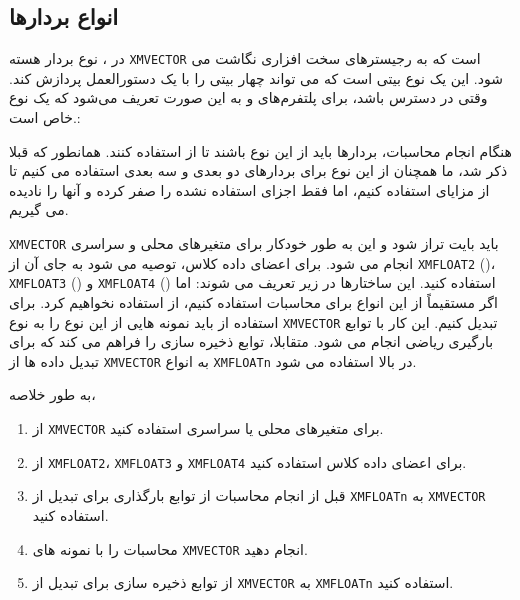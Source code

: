 \subsection{\textbf{انواع بردارها}}
{
    \Large
    \begin{spacing}{1.5}
        در ، نوع بردار هسته \texttt{XMVECTOR} است که به رجیسترهای سخت افزاری  نگاشت می شود.
        این یک نوع  بیتی است که می تواند چهار   بیتی را با یک دستورالعمل  پردازش کند.
        وقتی  در دسترس باشد، برای پلتفرم‌های  و  به این صورت تعریف می‌شود که  یک نوع  خاص است.:

        \begin{flushleft}
        \end{flushleft}

        هنگام انجام محاسبات، بردارها باید از این نوع باشند تا از  استفاده کنند.
        همانطور که قبلا ذکر شد، ما همچنان از این نوع برای بردارهای دو بعدی و سه بعدی استفاده می کنیم تا از مزایای  استفاده کنیم،
        اما فقط اجزای استفاده نشده را صفر کرده و آنها را نادیده می گیریم.

        \texttt{XMVECTOR} باید  بایت تراز شود و این به طور خودکار برای متغیرهای محلی و سراسری انجام می شود.
        برای اعضای داده کلاس، توصیه می شود به جای آن از \texttt{XMFLOAT2} ()، \texttt{XMFLOAT3} () و \texttt{XMFLOAT4} () استفاده کنید. این ساختارها در زیر تعریف می شوند:
        \textbf{\vspace{6pt}}
        \lr{}
        \textbf{\vspace{6pt}}
        اما اگر مستقیماً از این انواع برای محاسبات استفاده کنیم، از  استفاده نخواهیم کرد.
        برای استفاده از  باید نمونه هایی از این نوع را به نوع \texttt{XMVECTOR} تبدیل کنیم.
        این کار با توابع بارگیری ریاضی  انجام می شود.
        متقابلا،  توابع ذخیره سازی را فراهم می کند که برای تبدیل داده ها از \texttt{XMVECTOR} به انواع \texttt{XMFLOATn} در بالا استفاده می شود.

        به طور خلاصه،

        \begin{enumerate}[label=\textbf{\arabic*}.]
            \item {از \texttt{XMVECTOR} برای متغیرهای محلی یا سراسری استفاده کنید.}
            \item {از \texttt{XMFLOAT2}، \texttt{XMFLOAT3} و \texttt{XMFLOAT4} برای اعضای داده کلاس استفاده کنید.}
            \item {قبل از انجام محاسبات از توابع بارگذاری برای تبدیل از \texttt{XMFLOATn} به \texttt{XMVECTOR} استفاده کنید.}
            \item {محاسبات را با نمونه های \texttt{XMVECTOR} انجام دهید.}
            \item {از توابع ذخیره سازی برای تبدیل از \texttt{XMVECTOR} به \texttt{XMFLOATn} استفاده کنید.}
        \end{enumerate}
    \end{spacing}
}

